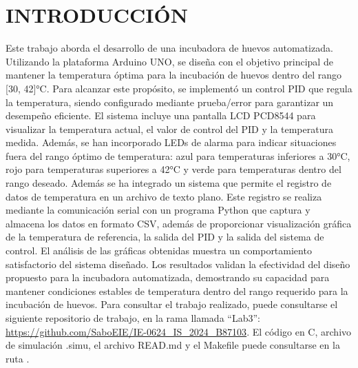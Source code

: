 \newpage
\section{INTRODUCCIÓN}
 Este trabajo aborda el desarrollo de una incubadora de huevos automatizada. Utilizando la plataforma Arduino UNO, se diseña con el objetivo principal de mantener la temperatura óptima para la incubación de huevos dentro del rango [30, 42]°C. Para alcanzar este propósito, se implementó un control PID que regula la temperatura, siendo configurado mediante prueba/error para garantizar un desempeño eficiente. El sistema incluye una pantalla LCD PCD8544 para visualizar la temperatura actual, el valor de control del PID y la temperatura medida. Además, se han incorporado LEDs de alarma para indicar situaciones fuera del rango óptimo de temperatura: azul para temperaturas inferiores a 30°C, rojo para temperaturas superiores a 42°C y verde para temperaturas dentro del rango deseado.
 Además se ha integrado un sistema que permite el registro de datos de temperatura en un archivo de texto plano. Este registro se realiza mediante la comunicación serial con un programa Python que captura y almacena los datos en formato CSV, además de proporcionar visualización gráfica de la temperatura de referencia, la salida del PID y la salida del sistema de control. El análisis de las gráficas obtenidas muestra un comportamiento satisfactorio del sistema diseñado. Los resultados validan la efectividad del diseño propuesto para la incubadora automatizada, demostrando su capacidad para mantener condiciones estables de temperatura dentro del rango requerido para la incubación de huevos.
 Para consultar el trabajo realizado, puede consultarse el siguiente repositorio de trabajo, en la rama llamada ``Lab3'': \url{https://github.com/SaboEIE/IE-0624_IS_2024_B87103}. El código en C, archivo de simulación .simu, el archivo READ.md y el Makefile puede consultarse en la ruta . 
 